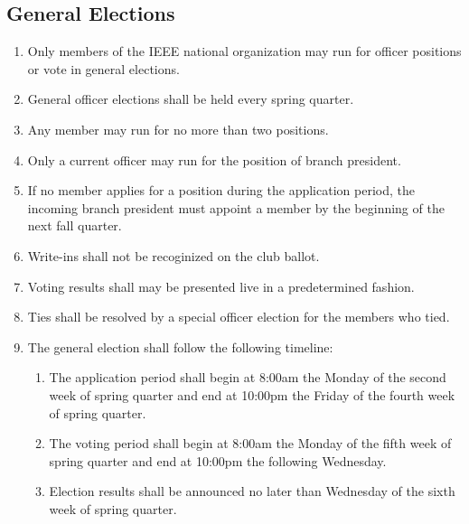 \documentclass{article}
\begin{document}
\subsection{General Elections}
\label{sec:general_elections}
\begin{enumerate}
\item Only members of the IEEE national organization may run for officer positions or vote in general elections.
\item General officer elections shall be held every spring quarter. 
\item Any member may run for no more than two positions.
\item Only a current officer may run for the position of branch president.
\item If no member applies for a position during the application period, the incoming branch president must appoint a member by the beginning of the next fall quarter.
\item Write-ins shall not be recoginized on the club ballot.
\item Voting results shall may be presented live in a predetermined fashion.
\item Ties shall be resolved by a special officer election for the members who tied.
\item The general election shall follow the following timeline:
  \begin{enumerate}
  \item The application period shall begin at 8:00am the Monday of the second week of spring quarter and end at 10:00pm the Friday of the fourth week of spring quarter.
  \item The voting period shall begin at 8:00am the Monday of the fifth week of spring quarter and end at 10:00pm the following Wednesday.
  \item Election results shall be announced no later than Wednesday of the sixth week of spring quarter.
  \end{enumerate}
\end{enumerate}
\end{document}
